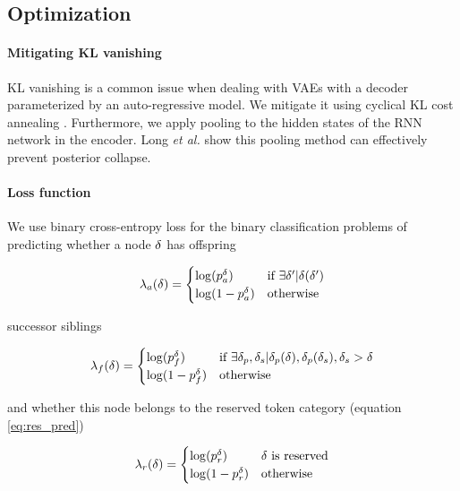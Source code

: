 \subsection{Optimization}

\paragraph{Mitigating KL vanishing}
KL vanishing is a common issue when dealing with VAEs with a decoder parameterized by an auto-regressive model.
We mitigate it using cyclical KL cost annealing \cite{fu2019cyclical}. 
Furthermore, we apply pooling to the hidden states of the RNN network in the encoder. Long \textit{et al.} \cite{long2019preventing} show this pooling method can effectively prevent posterior collapse. 

\paragraph{Loss function}
We use binary cross-entropy loss for the binary classification problems of predicting whether a node $\delta$ has offspring

\begin{align}
    \lambda_{a}(\delta) = \begin{cases}
        \log(p^\delta_a) & \text{if }\exists \delta' | \delta(\delta') \\
        \log(1- p^\delta_a) & \text{otherwise}
    \end{cases}
\end{align}

successor siblings

\begin{align}
    \lambda_{f}(\delta) = \begin{cases}
        \log(p^\delta_f) & \text{if }\exists \delta_p, \delta_s | \delta_p(\delta), \delta_p(\delta_s), \delta_s > \delta \\
        \log(1- p^\delta_f) & \text{otherwise}
    \end{cases}
\end{align}

and whether this node belongs to the reserved token category (equation \ref{eq:res_pred})

\begin{align}
    \lambda_{r}(\delta) = \begin{cases}
        \log(p^\delta_r)  & \delta \text{ is reserved} \\
        \log(1- p^\delta_r)  & \text{otherwise}
    \end{cases}
\end{align}

